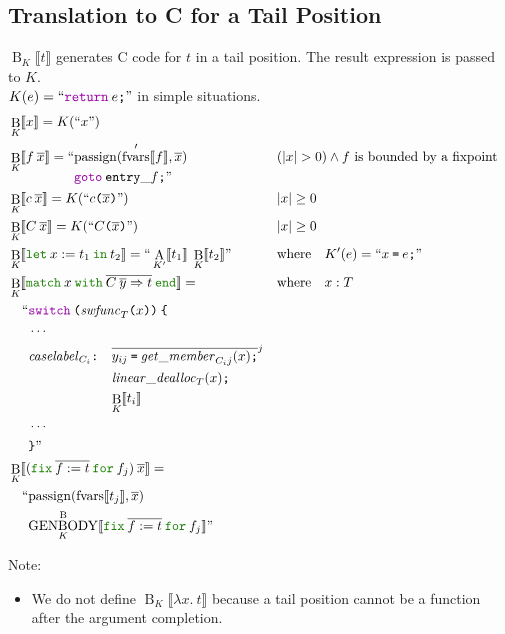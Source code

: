 \documentclass[a4paper,fleqn]{article}
\newcommand{\kwlet}{\mbox{\color{mygreen}\ttfamily let}}
\newcommand{\kwin}{\mbox{\color{mygreen}\ttfamily in}}
\newcommand{\kwmatch}{\mbox{\color{mygreen}\ttfamily match}}
\newcommand{\kwwith}{\mbox{\color{mygreen}\ttfamily with}}
\newcommand{\kwend}{\mbox{\color{mygreen}\ttfamily end}}
\newcommand{\kwfix}{\mbox{\color{mygreen}\ttfamily fix}}
\newcommand{\kwfor}{\mbox{\color{mygreen}\ttfamily for}}
\newcommand{\lam}[2]{\lambda #1.\:#2}
\newcommand{\letin}[3]{\kwlet\:#1:=#2\:\kwin\:#3}
\newcommand{\omatch}[2]{\kwmatch\:#1\:\kwwith\:{#2}\:\kwend}
\newcommand{\ofix}[2]{\kwfix\:{#1}\:\kwfor\:{#2}}
\newcommand{\BRA}[1]{\llbracket #1 \rrbracket}
\DeclareMathOperator{\genbody}{GENBODY}
\newcommand{\genbodyb}[2]{\genbody^\mathrm{B}_{#1}\BRA{#2}}
\newcommand{\ldq}{\text{``}}
\newcommand{\rdq}{\text{''}}
\newcommand{\dq}[1]{\text{``}#1\text{''}}
\newcommand{\ttparen}[1]{\texttt{(}#1\texttt{)}}
\newcommand{\ttlbrace}{\texttt{\char '173}}
\newcommand{\ttrbrace}{\texttt{\char '175}}
\newcommand{\tteq}{\texttt{=}}
\newcommand{\ttsemi}{\texttt{;}}
\newcommand{\ttcolon}{\texttt{:}}
\newcommand{\kwswitch}{\mbox{\color{myviolet}\ttfamily switch}}
\newcommand{\kwgoto}{\mbox{\color{myviolet}\ttfamily goto}}
\newcommand{\kwCreturn}{\mbox{\color{myviolet}\ttfamily return}}
\DeclareMathOperator{\passign}{passign}
\DeclareMathOperator{\fvarsop}{fvars}
\newcommand{\fvars}[1]{\fvarsop\BRA{#1}}
\newcommand{\fvarsd}[1]{\fvarsop'\BRA{#1}}
\DeclareMathOperator{\Aop}{A}
\DeclareMathOperator{\Bop}{B}
\newcommand{\A}[2]{\Aop_{#1}\BRA{#2}}
\newcommand{\B}[2]{\Bop_{#1}\BRA{#2}}
\newcommand{\rep}[1]{\overline{#1}}
\newcommand{\repi}[2]{\overline{#1}^{#2}}
\begin{document}
\subsection{Translation to C for a Tail Position}\label{sec:BK}
$\B{K}{t}$ generates C code for $t$ in a tail position.
The result expression is passed to $K$. \\
$K(e) = \dq{\kwCreturn\:e\ttsemi}$ in simple situations.
\begin{align*}
  &\B{K}{x} = K(\dq{x}) \\
  &\B{K}{f\:\rep{x}} = \begin{aligned}[t] \ldq & {\passign(\fvarsd{f}, \rep{x})} \\ & \kwgoto\:\mathtt{entry\_}f\ttsemi \rdq \end{aligned}
    && (|x| > 0) \wedge \text{$f$ is bounded by a fixpoint} \\
  &\B{K}{c\:\rep{x}} = K(\dq{c\ttparen{\rep{x}}})                                   && |x| \geq 0 \\
  &\B{K}{C\:\rep{x}} = K(\dq{C\ttparen{\rep{x}}})                                   && |x| \geq 0 \\
  &\B{K}{\letin{x}{t_1}{t_2}} = \ldq \A{K'}{t_1}\; \B{K}{t_2} \rdq
    && \text{where}\quad K'(e) = \dq{x\:\tteq\:e\ttsemi} \\
  &\B{K}{\omatch{x}{\rep{C\:\rep{y}\Rightarrow t}}} = && \text{where}\quad x : T \\
     & \quad\begin{alignedat}{2}
       \ldq & \kwswitch\:\ttparen{\mathit{swfunc}_T\ttparen{x}}\:\ttlbrace \\
            & \cdots \\
            & \mathit{caselabel}_{C_i}\ttcolon\quad
              \begin{aligned}[t]
                & \repi{y_{ij}\:\tteq\:\mathit{get\_member}_{C_i j}(x)\ttsemi}{j} \\
                & \mathit{linear\_dealloc}_{T}(x)\ttsemi \\
                & {\B{K}{t_i}}
              \end{aligned} \\
            & \cdots \\
            & \ttrbrace\rdq
     \end{alignedat} \\
  &\B{K}{(\ofix{\rep{f:=t}}{f_j})\:\rep{x}} =       \\
     & \quad\begin{alignedat}{2}
       \ldq & {\passign(\fvars{t_j}, \rep{x})} \\
            & {\genbodyb{K}{\ofix{\rep{f:=t}}{f_j}}} \rdq
       \end{alignedat}
\end{align*}
{\small Note:
\begin{itemize}
  \item We do not define $\B{K}{\lam{x}{t}}$ because a tail position cannot be a function after the argument completion.
\end{itemize}}
\end{document}
